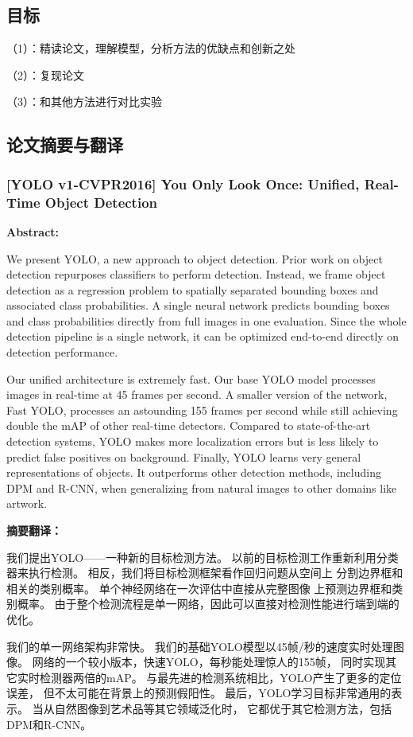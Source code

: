 \documentclass[a4paper, notitlepage]{article}
\begin{document}
\subsection{目标}
（1）：精读论文，理解模型，分析方法的优缺点和创新之处

（2）：复现论文

（3）：和其他方法进行对比实验

\subsection{论文摘要与翻译}
\subsubsection{[YOLO v1-CVPR2016] You Only Look Once: Unified, Real-Time Object Detection}
\textbf{Abstract:}

We present YOLO, a new approach to object detection.
Prior work on object detection repurposes classifiers to perform
detection. Instead, we frame object detection as a regression
problem to spatially separated bounding boxes and
associated class probabilities. A single neural network predicts
bounding boxes and class probabilities directly from
full images in one evaluation. Since the whole detection
pipeline is a single network, it can be optimized end-to-end
directly on detection performance.

Our unified architecture is extremely fast. Our base
YOLO model processes images in real-time at 45 frames
per second. A smaller version of the network, Fast YOLO,
processes an astounding 155 frames per second while
still achieving double the mAP of other real-time detectors.
Compared to state-of-the-art detection systems, YOLO
makes more localization errors but is less likely to predict
false positives on background. Finally, YOLO learns very
general representations of objects. It outperforms other detection
methods, including DPM and R-CNN, when generalizing
from natural images to other domains like artwork.

\textbf{摘要翻译：}

我们提出YOLO——一种新的目标检测方法。
以前的目标检测工作重新利用分类器来执行检测。
相反，我们将目标检测框架看作回归问题从空间上
分割边界框和相关的类别概率。
单个神经网络在一次评估中直接从完整图像
上预测边界框和类别概率。
由于整个检测流程是单一网络，因此可以直接对检测性能进行端到端的优化。

我们的单一网络架构非常快。
我们的基础YOLO模型以45帧/秒的速度实时处理图像。
网络的一个较小版本，快速YOLO，每秒能处理惊人的155帧，
同时实现其它实时检测器两倍的mAP。
与最先进的检测系统相比，YOLO产生了更多的定位误差，
但不太可能在背景上的预测假阳性。
最后，YOLO学习目标非常通用的表示。
当从自然图像到艺术品等其它领域泛化时，
它都优于其它检测方法，包括DPM和R-CNN。
\end{document}
